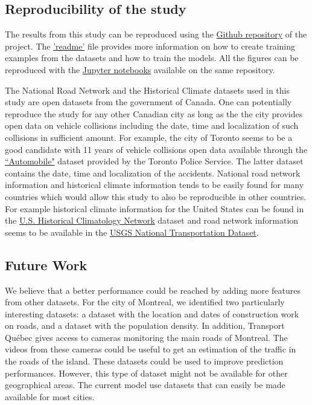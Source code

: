 \documentclass[conference]{IEEEtran}
\begin{document}
\subsection{Reproducibility of the study} %

The results from this study can be reproduced using the \href{https://github.com/big-data-lab-team/accident-prediction-montreal}{Github repository} of the project. The \href{https://github.com/big-data-lab-team/accident-prediction-montreal/blob/master/README.md }{'readme'} file provides more information on how to create training examples from the datasets and how to train the models. All the figures can be reproduced with the \href{https://github.com/big-data-lab-team/accident-prediction-montreal/tree/master/notebooks}{Jupyter notebooks} available on the same repository.

The National Road Network and the Historical Climate datasets used in this study are open datasets from the government of Canada. 
One can potentially reproduce the study for any other Canadian city as long as the the city provides open data on vehicle collisions including the date, time and localization of such collisions in sufficient amount. 
For example, the city of Toronto seems to be a good candidate with 11 years of vehicle collisions open data available through the \href{http://data.torontopolice.on.ca/datasets/automobile}{``Automobile"} dataset provided by the Toronto Police Service. 
The latter dataset contains the date, time and localization of the accidents. National road network information and historical climate information tends to be easily found for many countries which would allow this study to also be reproducible in other countries. For example historical climate information for the United States can be found in the \href{https://data.ess-dive.lbl.gov/view/doi:10.3334/CDIAC/CLI.NDP019}{U.S. Historical Climatology Network} dataset and road network information seems to be available in the \href{https://catalog.data.gov/dataset/usgs-national-transportation-dataset-ntd-downloadable-data-collectionde7d2}{USGS National Transportation Dataset}.



\subsection{Future Work}

We believe that a better performance could be reached by adding more features
from other datasets. For the city of Montreal, we identified two
particularly interesting datasets: a dataset with the location and dates of
construction work on roads, and a dataset with the population density.
In addition, Transport Qu\'ebec gives access to cameras monitoring the main
roads of Montreal. The videos from these cameras could be useful to get an
estimation of the traffic in the roads of the island.
These datasets could be used to improve prediction performances.
However, this type of dataset might not be available for other geographical areas.
The current model use datasets that can easily be made available for most cities.
\end{document}
